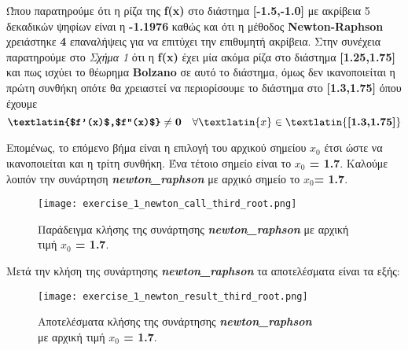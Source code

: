 \documentclass[First Project.tex]{subfiles}
\begin{document}
Ώπου παρατηρούμε ότι η ρίζα της \textlatin{\textbf{f(x)}} στο διάστημα \textlatin{\textbf{[-1.5,-1.0]}} με ακρίβεια 5 δεκαδικών ψηφίων 
είναι η \textbf{-1.1976} καθώς και ότι η μέθοδος \textlatin{\textbf{Newton-Raphson}} χρειάστηκε \textbf{4} επαναλήψεις για να επιτύχει την επιθυμητή ακρίβεια.
Στην συνέχεια παρατηρούμε στο \textit{Σχήμα 1} ότι η \textlatin{\textbf{f(x)}} έχει μία ακόμα ρίζα στο διάστημα \textlatin{\textbf{[1.25,1.75]}} και
πως ισχύει το θέωρημα \textlatin{\textbf{Bolzano}} σε αυτό το διάστημα, όμως δεν ικανοποιείται η πρώτη συνθήκη οπότε θα χρειαστεί να 
περιορίσουμε το διάστημα στο \textlatin{\textbf{[1.3,1.75]}} όπου έχουμε 
\begin{equation*}
    \textbf{\textlatin{$f'(x)$,$f''(x)$}} \neq \textbf{0} \quad \forall \textlatin{x} \in \textlatin{\textbf{[1.3,1.75]}}
\end{equation*}

Επομένως, το επόμενο βήμα είναι η επιλογή του αρχικού σημείου \textbf{\textlatin{$x_{0}$}} έτσι ώστε να ικανοποιείται και η τρίτη συνθήκη.
Ένα τέτοιο σημείο είναι το \textbf{\textlatin{$x_{0}$ = 1.7}}.
Καλούμε λοιπόν την συνάρτηση \textit{\textlatin{\textbf{newton\_raphson}}} με αρχικό σημείο το \textlatin{\textbf{$x_{0}$= 1.7}}.
\vspace{5px}
\begin{figure}[hp]
    \centering
    \captionsetup{justification=centering}
    \begin{center}
        \texttt{[image: exercise\_1\_newton\_call\_third\_root.png]}    
        \caption{Παράδειγμα κλήσης της συνάρτησης \textit{\textlatin{\textbf{newton\_raphson}}} με αρχική τιμή \textbf{\textlatin{$x_{0}$ = 1.7}}.}
    \end{center}
\end{figure}


Μετά την κλήση της συνάρτησης \textit{\textlatin{\textbf{newton\_raphson}}} τα αποτελέσματα είναι τα εξής:
\vspace{5px}
\begin{figure}[h!]
    \centering
    \captionsetup{justification=centering}
    \begin{center}
    \texttt{[image: exercise\_1\_newton\_result\_third\_root.png]}    
    \caption{ Αποτελέσματα κλήσης της συνάρτησης \textit{\textlatin{\textbf{newton\_raphson}}} \\ με αρχική τιμή \textbf{\textlatin{$x_{0}$ = 1.7}}. }
    \end{center}
\end{figure}
\end{document}
